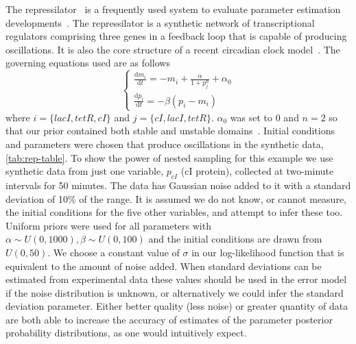 The repressilator~\cite{elowitz2000} is a frequently used system to evaluate parameter estimation developments~\cite{lillacci2010, quach2007, toni2009, vyshemirsky2008}.
The repressilator is a synthetic network of transcriptional regulators comprising three genes in a feedback loop that is capable of producing oscillations.
It is also the core structure of a recent circadian clock model~\cite{pokhilko2012}. 
The governing equations used are as follows
\begin{equation}
\begin{cases}
  \displaystyle
  \frac{\mathrm{d}m_i}{\mathrm{d}t} = -m_i + \frac{\alpha}{1 + p_j^n} + \alpha_0\\
  \displaystyle
  \frac{\mathrm{d}p_i}{\mathrm{d}t} = -\beta\left(p_i - m_i\right)
\end{cases}
\label{rep-sys}
\end{equation}
where $i = \{lacI, tetR, cI\}$ and $j= \{cI, lacI, tetR\}$.
$\alpha_0$ was set to 0 and $n=2$ so that our prior contained both stable and unstable domains~\cite{elowitz2000}.
Initial conditions and parameters were chosen that produce oscillations in the synthetic data, \autoref{tab:rep-table}.
To show the power of nested sampling for this example we use synthetic data from just one variable, $p_{cI}$ (cI protein), collected at two-minute intervals for 50 minutes.
The data has Gaussian noise added to it with a standard deviation of 10\% of the range.
It is assumed we do not know, or cannot measure, the initial conditions for the five other variables, and attempt to infer these too.
Uniform priors were used for all parameters with $\alpha\sim U(0,1000), \beta\sim U(0,100)$ and the initial conditions are drawn from $U(0,50)$.
We choose a constant value of $\sigma$ in our log-likelihood function that is equivalent to the amount of noise added.
When standard deviations can be estimated from experimental data these values should be used in the error model if the noise distribution is unknown, or alternatively we could infer the standard deviation parameter.
Either better quality (less noise) or greater quantity of data are both able to increase the accuracy of estimates of the parameter posterior probability distributions, as one would intuitively expect.

